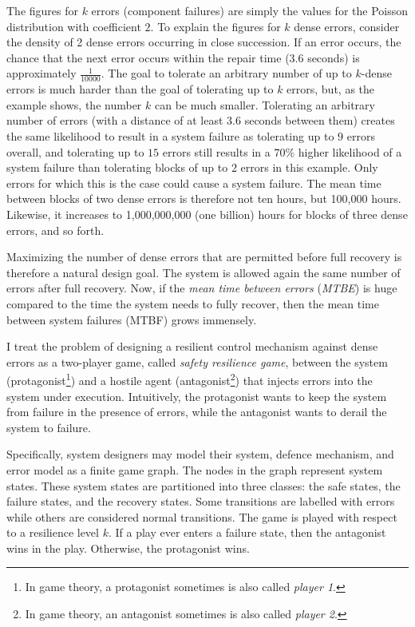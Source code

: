 The figures for $k$ errors (component failures) are simply the values for the Poisson distribution with coefficient $2$.
To explain the figures for $k$ dense errors, consider the density of 2 dense errors occurring in close succession.
If an error occurs, the chance that the next error occurs within the repair time (3.6 seconds) is approximately $\frac{1}{10000}$.
The goal to tolerate an arbitrary number of up to $k$-dense errors is much harder than the goal of tolerating up to $k$ errors, but, as the example shows, the number $k$ can be much smaller.   
Tolerating an arbitrary number of errors (with a distance of at least $3.6$ seconds between them) creates the same likelihood to result in a system failure as tolerating up to $9$ errors overall, and tolerating up to $15$ errors still results in a $70\%$ higher likelihood of a system failure than tolerating blocks of up to $2$ errors in this example. 
Only errors for which this is the case could cause a system failure.
The mean time between blocks of two dense errors is therefore not ten hours, but 100,000 hours.
Likewise, it increases to 1,000,000,000 (one billion) hours for blocks of three dense errors, and so forth.

Maximizing the number of dense errors that are permitted before full recovery is therefore a natural design goal.  
The system is allowed again the same number of errors after full recovery.
Now, if the {\em mean time between errors} ({\em MTBE}) is huge compared to the time the system needs to fully recover, then the mean time between system failures (MTBF) grows immensely. 

I treat the problem of designing a resilient control mechanism against dense errors as a two-player game, called {\em safety resilience game}, between the system (protagonist\footnote{In game theory, a protagonist sometimes is also called {\em player 1}.}) and a hostile agent (antagonist\footnote{In game theory, an antagonist sometimes is also called {\em player 2}.}) that injects errors into the system under execution.
Intuitively, the protagonist wants to keep the system from failure in the presence of errors, while the antagonist wants to derail the system to failure.

Specifically, system designers may model their system, defence mechanism, and error model as a finite game graph.
The nodes in the graph represent system states.
These system states are partitioned into three classes: the safe states, the failure states, and the recovery states. 
Some transitions are labelled with errors while others are considered normal transitions.
The game is played with respect to a resilience level $k$.
If a play ever enters a failure state, then the antagonist wins in the play.  
Otherwise, the protagonist wins.

